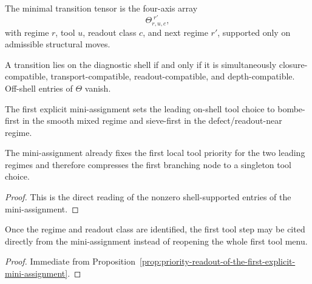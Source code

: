 \begin{definition}
\label{def:minimal-structural-diagnostic-transition-tensor}
The minimal transition tensor is the four-axis array
\[
\Theta_{r,u,c}^{\;r'},
\]
with regime $r$, tool $u$, readout class $c$, and next regime $r'$, supported only on admissible structural moves.
\end{definition}

\begin{definition}
\label{def:first-diagnostic-shell-condition-for-the-minimal-transition-tensor}
A transition lies on the diagnostic shell if and only if it is simultaneously closure-compatible, transport-compatible, readout-compatible, and depth-compatible. Off-shell entries of $\Theta$ vanish.
\end{definition}

\begin{definition}
\label{def:first-explicit-mini-assignment-for-the-leading-optical-regimes}
The first explicit mini-assignment sets the leading on-shell tool choice to bombe-first in the smooth mixed regime and sieve-first in the defect/readout-near regime.
\end{definition}

\begin{proposition}
\label{prop:priority-readout-of-the-first-explicit-mini-assignment}
The mini-assignment already fixes the first local tool priority for the two leading regimes and therefore compresses the first branching node to a singleton tool choice.
\end{proposition}

\begin{proof}
This is the direct reading of the nonzero shell-supported entries of the mini-assignment.
\end{proof}

\begin{corollary}
\label{cor:what-the-explicit-mini-assignment-already-buys-for-proof-economy}
Once the regime and readout class are identified, the first tool step may be cited directly from the mini-assignment instead of reopening the whole first tool menu.
\end{corollary}

\begin{proof}
Immediate from Proposition~\ref{prop:priority-readout-of-the-first-explicit-mini-assignment}.
\end{proof}

